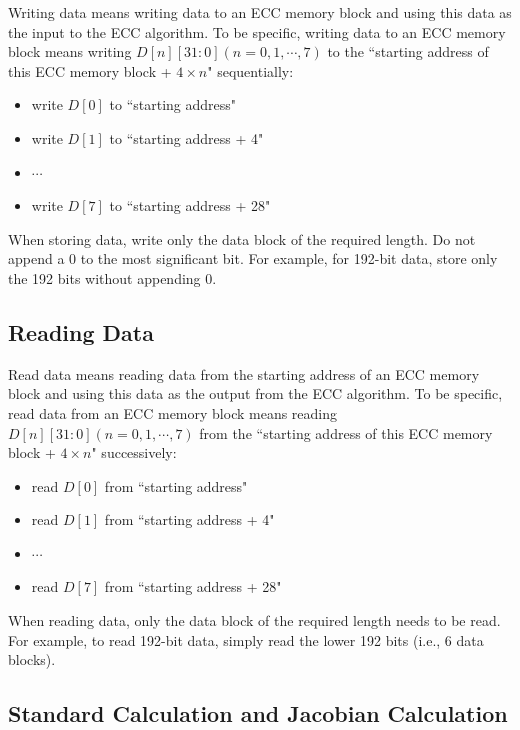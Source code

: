 \documentclass[main\_\_EN.tex]{subfiles}
\begin{document}
Writing data means writing data to an ECC memory block and using this data as the input to the ECC algorithm. To be specific, writing data to an ECC memory block means writing $D[n][31:0] (n=0, 1, \cdots, 7)$ to the ``starting address of this ECC memory block + $4 \times n$" sequentially:

\begin{itemize}
    \item write $D[0]$ to ``starting address"
    \item write $D[1]$ to ``starting address + 4"
    \item $\cdots$
    \item write $D[7]$ to ``starting address + 28"
\end{itemize}

\begin{tiplisting}
When storing data, write only the data block of the required length. Do not append a 0 to the most significant bit. For example, for 192-bit data, store only the 192 bits without appending 0.
\end{tiplisting}

\subsection{Reading Data}

Read data means reading data from the starting address of an ECC memory block and using this data as the output from the ECC algorithm. To be specific, read data from an ECC memory block means reading $D[n][31:0] (n=0, 1, \cdots, 7)$ from the ``starting address of this ECC memory block + $4 \times n$" successively:
\begin{itemize}
    \item read $D[0]$ from ``starting address"
    \item read $D[1]$ from ``starting address + 4"
    \item $\cdots$
    \item read $D[7]$ from ``starting address + 28"
\end{itemize}

\begin{tiplisting}
When reading data, only the data block of the required length needs to be read. For example, to read 192-bit data, simply read the lower 192 bits (i.e., 6 data blocks).
\end{tiplisting}


\subsection{Standard Calculation and Jacobian Calculation}
\end{document}

